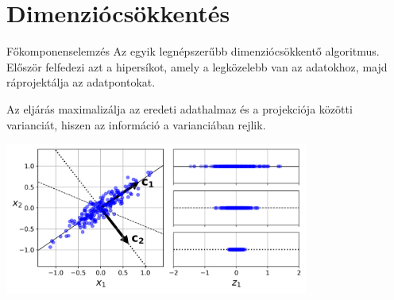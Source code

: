 \documentclass[english, aspectratio=169]{beamer}
\makeatletter
\let\origtableofcontents=\tableofcontents
\def\tableofcontents{\@ifnextchar[{\origtableofcontents}{\gobbletableofcontents}}
\def\gobbletableofcontents#1{\origtableofcontents}
\makeatother
\begin{document}
\section{Dimenziócsökkentés}

\begin{frame}
\tableofcontents[currentsection]
\end{frame}

\begin{frame}{Főkomponenselemzés}
Az egyik legnépszerűbb dimenziócsökkentő algoritmus. Először felfedezi azt a hipersíkot, amely a legközelebb van az adatokhoz, majd ráprojektálja az adatpontokat.\par\smallskip
Az eljárás maximalizálja az eredeti adathalmaz és a projekciója közötti varianciát, hiszen az információ a varianciában rejlik.
\begin{center}
\includegraphics[width=10cm, keepaspectratio]{images/unsupervised_12.png}
\end{center}
\end{frame}
\end{document}
